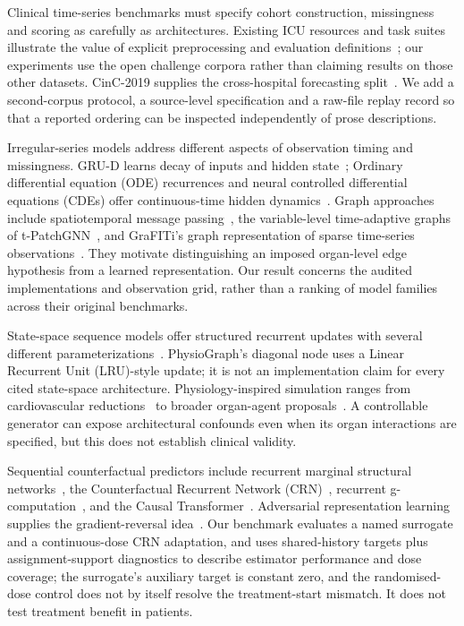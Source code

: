 Clinical time-series benchmarks must specify cohort construction, missingness and scoring as carefully as architectures. Existing ICU resources and task suites illustrate the value of explicit preprocessing and evaluation definitions~\cite{harutyunyan2019,johnson2023,pollard2018}; our experiments use the open challenge corpora rather than claiming results on those other datasets. CinC-2019 supplies the cross-hospital forecasting split~\cite{reyna2020}. We add a second-corpus protocol, a source-level specification and a raw-file replay record so that a reported ordering can be inspected independently of prose descriptions.

Irregular-series models address different aspects of observation timing and missingness. GRU-D learns decay of inputs and hidden state~\cite{che2018}; Ordinary differential equation (ODE) recurrences and neural controlled differential equations (CDEs) offer continuous-time hidden dynamics~\cite{rubanova2019,kidger2020}. Graph approaches include spatiotemporal message passing~\cite{yu2018}, the variable-level time-adaptive graphs of t-PatchGNN~\cite{tpatchgnn2024}, and GraFITi's graph representation of sparse time-series observations~\cite{grafiti2024}. They motivate distinguishing an imposed organ-level edge hypothesis from a learned representation. Our result concerns the audited implementations and observation grid, rather than a ranking of model families across their original benchmarks.

State-space sequence models offer structured recurrent updates with several different parameterizations~\cite{gu2022,smith2023,orvieto2023,gu2023}. PhysioGraph's diagonal node uses a Linear Recurrent Unit (LRU)-style update; it is not an implementation claim for every cited state-space architecture. Physiology-inspired simulation ranges from cardiovascular reductions~\cite{heldt2010} to broader organ-agent proposals~\cite{chang2025}. A controllable generator can expose architectural confounds even when its organ interactions are specified, but this does not establish clinical validity.

Sequential counterfactual predictors include recurrent marginal structural networks~\cite{lim2018}, the Counterfactual Recurrent Network (CRN)~\cite{bica2020}, recurrent g-computation~\cite{li2021}, and the Causal Transformer~\cite{melnychuk2022}. Adversarial representation learning supplies the gradient-reversal idea~\cite{ganin2016}. Our benchmark evaluates a named surrogate and a continuous-dose CRN adaptation, and uses shared-history targets plus assignment-support diagnostics to describe estimator performance and dose coverage; the surrogate's auxiliary target is constant zero, and the randomised-dose control does not by itself resolve the treatment-start mismatch. It does not test treatment benefit in patients.

